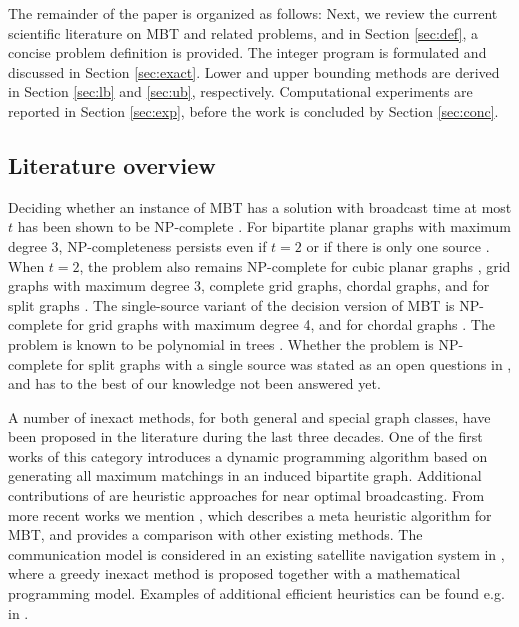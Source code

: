 The remainder of the paper is organized as follows:
Next, we review the current scientific literature on MBT and related problems,
and in Section \ref{sec:def}, a concise problem definition is provided.
The integer program is formulated and discussed in Section \ref{sec:exact}.
Lower and upper bounding methods are derived in Section \ref{sec:lb} and \ref{sec:ub}, respectively.
Computational experiments are reported in Section \ref{sec:exp}, before the work is concluded by Section \ref{sec:conc}.

\subsection{Literature overview} \label{sec:litrev}

Deciding whether an instance of MBT has a solution with broadcast time at most $t$ has been shown to be NP-complete \cite{slater81}. 
For bipartite planar graphs with maximum degree 3, NP-completeness persists even if $t=2$ or if there is only one source \cite{jansen95}.
When $t=2$, the problem also remains NP-complete for cubic planar graphs \cite{middendorf93}, grid graphs with maximum degree 3,
complete grid graphs, chordal graphs, and for split graphs \cite{jansen95}. 
The single-source variant of the decision version of MBT is NP-complete for grid graphs with maximum degree 4, and for chordal graphs \cite{jansen95}.
The problem is known to be polynomial in trees \cite{slater81}.
Whether the problem is NP-complete for split graphs with a single source was stated as an open questions in \cite{jansen95}, and has to the best of our knowledge not been answered yet.

A number of inexact methods, for both general and special graph classes, have been proposed in the literature during the last three decades.
One of the first works of this category \cite{scheuermann84} 
introduces a dynamic programming algorithm based on generating all maximum matchings in an induced bipartite graph.
Additional contributions of \cite{scheuermann84} are heuristic approaches for near optimal broadcasting.
From more recent works we mention \cite{hasson04}, which describes a meta heuristic algorithm for MBT, and provides a comparison with other existing methods.
The communication model is considered in an existing satellite navigation system in \cite{chu17}, where a greedy inexact method is proposed together with a mathematical programming model.
Examples of additional efficient heuristics can be found e.g. in \cite{harutyunyan06,harutyunyan14,wang10,jimborean13}.

